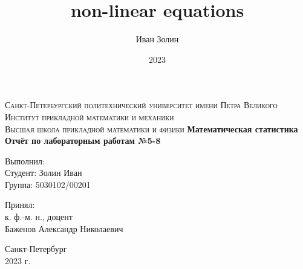 \documentclass[a4paper,14pt]{article}
\title{non-linear equations}
\author{Иван Золин}
\date{2023}
\begin{document}
	
	\begin{titlepage}
		\begin{center}
			\textsc{
				Санкт-Петербургский политехнический университет имени Петра Великого \\[5mm]
				Институт прикладной математики и механики\\[2mm]
				Высшая школа прикладной математики и физики            
			}   
			\vfill
			\textbf{\large
				Математическая статистика\\
				Отчёт по лабораторным работам №5-8 \\[3mm]
			}                
		\end{center}
		
		\vfill
		\hfill
		\begin{minipage}{0.5\textwidth}
			Выполнил: \\[2mm]   
			Студент: Золин Иван \\
			Группа: 5030102/00201\\
		\end{minipage}
		
		\hfill
		\begin{minipage}{0.5\textwidth}
			Принял: \\[2mm]
			к. ф.-м. н., доцент \\   
			Баженов Александр Николаевич
		\end{minipage}
		
		\vfill
		\begin{center}
			Санкт-Петербург \\2023 г.
		\end{center}
	\end{titlepage}
	
	\tableofcontents
	\newpage
	\listoffigures
	\newpage
	\listoftables
	\newpage
	
\end{document}
